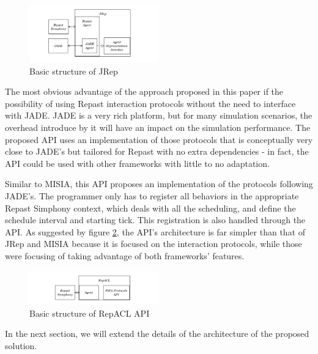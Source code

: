 \begin{figure}[h]
	\centering
	\includegraphics[width=0.5\textwidth]{figures/jrep.png}
	\caption{Basic structure of JRep}
	\label{fig:jrep}
\end{figure}

The most obvious advantage of the approach proposed in this paper if the possibility of using Repast interaction protocols without the need to interface with JADE. JADE is a very rich platform, but for many simulation scenarios, the overhead introduce by it will have an impact on the simulation performance. The proposed API uses an implementation of those protocols that is conceptually very close to JADE's but tailored for Repast with no extra dependencies - in fact, the API could be used with other frameworks with little to no adaptation.

Similar to MISIA, this API proposes an implementation of the protocols following JADE's. The programmer only has to register all behaviors in the appropriate Repast Simphony context, which deals with all the scheduling, and define the schedule interval and starting tick. This registration is also handled through the API. As suggested by figure \ref{fig:related-repacl}, the API's architecture is far simpler than that of JRep and MISIA because it is focused on the interaction protocols, while those were focusing of taking advantage of both frameworks' features.

\begin{figure}[h]
	\centering
	\includegraphics[width=0.5\textwidth]{figures/repacl.png}
	\caption{Basic structure of RepACL API}
	\label{fig:related-repacl}
\end{figure}

In the next section, we will extend the details of the architecture of the proposed solution.